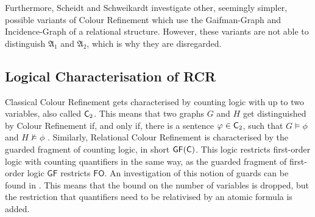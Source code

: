 Furthermore, Scheidt and Schweikardt investigate other, seemingly simpler, possible variants of Colour Refinement which use the Gaifman-Graph and Incidence-Graph of a relational structure.
However, these variants are not able to distinguish $\mathfrak A_1$ and $\mathfrak A_2$, which is why they are disregarded.

\subsection{Logical Characterisation of RCR}

Classical Colour Refinement gets characterised by counting logic with up to two variables, also called $\mathsf{C}_{2}$.
This means that two graphs $G$ and $H$ get distinguished by Colour Refinement if, and only if, there is a sentence $\varphi\in \mathsf{C}_{2}$, such that $G\models \phi$ and $H\not\models \phi$ \cite{immerman1990DescribingGraphs}.
Similarly, Relational Colour Refinement is characterised by the guarded fragment of counting logic, in short $\mathsf{GF}(\mathsf{C})$.
This logic restricts first-order logic with counting quantifiers in the same way, as the guarded fragment of first-order logic $\mathsf{GF}$ restricts $\mathsf{FO}$.
An investigation of this notion of guards can be found in \cite{gradel1999RestrainingPower}.
This means that the bound on the number of variables is dropped, but the restriction that quantifiers need to be relativised by an atomic formula is added.

